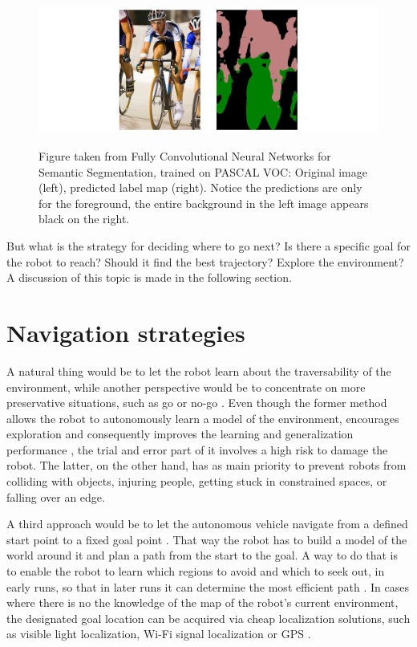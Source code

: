 \documentclass[12pt,a4paper,table,dvipsnames,tikz]{report}
\newcommand{\acronym}{\MakeUppercase}
\begin{document}
	\begin{figure}[h!]
		\caption{Figure taken from Fully Convolutional Neural Networks for Semantic 
		Segmentation, trained on \acronym{pascal voc}: Original image (left), predicted 
		label map (right). Notice the predictions are only for the foreground, the entire 
		background in the left image appears black on the right.}
		\centering
		\includegraphics[width=\textwidth]{fcn}
		\label{fig:fcn}
	\end{figure}
	
	
	But what is the strategy for deciding where to go next? Is there a specific goal 
	for the robot to reach? Should it find the best trajectory? Explore the 
	environment? A discussion of this topic is made in the following section.
	\\
	
	\section{Navigation strategies}
	\label{sec:bg:goals}
	
	A natural thing would be to let the robot learn about the traversability 
	of the environment, while another perspective would be to concentrate on more 
	preservative situations, such as go or no-go \citep{Hirose}. Even though the 
	former method allows the robot to autonomously learn a model of the environment,
	encourages exploration and consequently improves the learning and generalization 
	performance \citep{Zhelo}, the trial and error part of it involves a high risk to 
	damage the robot. The latter, on the other hand, has as main priority to prevent 
	robots from colliding with objects, injuring people, getting stuck in constrained 
	spaces, or falling over an edge. 
	\par
	A third approach would be to let the autonomous vehicle navigate from a defined 
	start point to a fixed goal	point \citep{Shneier, Zhelo}. That way the robot has 
	to build a model of the world around it and plan a path from the start to the 
	goal. A way to do that is to enable the robot to learn which regions to avoid 
	and which to seek out, in early runs, so that in later runs it can determine the 
	most efficient path \citep{Shneier}. In cases where there is no the knowledge of 
	the map of the robot's current environment, the designated goal location can be 
	acquired via cheap localization solutions, such as visible light localization, 
	Wi-Fi signal localization or \acronym{gps} \citep{Zhelo}.
	\\
	
\end{document}
